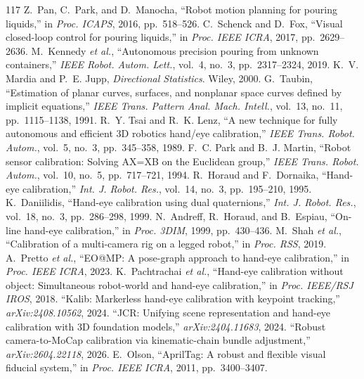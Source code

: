 \documentclass[10pt,journal]{IEEEtran}
\begin{document}
{\begin{thebibliography}{117}
 Z.~Pan, C.~Park, and D.~Manocha, ``Robot motion planning for pouring liquids,'' in \emph{Proc. ICAPS}, 2016, pp.~518--526.
 C.~Schenck and D.~Fox, ``Visual closed-loop control for pouring liquids,'' in \emph{Proc. IEEE ICRA}, 2017, pp.~2629--2636.
 M.~Kennedy \emph{et al.}, ``Autonomous precision pouring from unknown containers,'' \emph{IEEE Robot. Autom. Lett.}, vol.~4, no.~3, pp.~2317--2324, 2019.
 K.~V. Mardia and P.~E. Jupp, \emph{Directional Statistics}. Wiley, 2000.
 G.~Taubin, ``Estimation of planar curves, surfaces, and nonplanar space curves defined by implicit equations,'' \emph{IEEE Trans. Pattern Anal. Mach. Intell.}, vol.~13, no.~11, pp.~1115--1138, 1991.
 R.~Y. Tsai and R.~K. Lenz, ``A new technique for fully autonomous and efficient 3D robotics hand/eye calibration,'' \emph{IEEE Trans. Robot. Autom.}, vol.~5, no.~3, pp.~345--358, 1989.
 F.~C. Park and B.~J. Martin, ``Robot sensor calibration: Solving AX=XB on the Euclidean group,'' \emph{IEEE Trans. Robot. Autom.}, vol.~10, no.~5, pp.~717--721, 1994.
 R.~Horaud and F.~Dornaika, ``Hand-eye calibration,'' \emph{Int. J. Robot. Res.}, vol.~14, no.~3, pp.~195--210, 1995.
 K.~Daniilidis, ``Hand-eye calibration using dual quaternions,'' \emph{Int. J. Robot. Res.}, vol.~18, no.~3, pp.~286--298, 1999.
 N.~Andreff, R.~Horaud, and B.~Espiau, ``On-line hand-eye calibration,'' in \emph{Proc. 3DIM}, 1999, pp.~430--436.
 M.~Shah \emph{et al.}, ``Calibration of a multi-camera rig on a legged robot,'' in \emph{Proc. RSS}, 2019.
 A.~Pretto \emph{et al.}, ``EO@MP: A pose-graph approach to hand-eye calibration,'' in \emph{Proc. IEEE ICRA}, 2023.
 K.~Pachtrachai \emph{et al.}, ``Hand-eye calibration without object: Simultaneous robot-world and hand-eye calibration,'' in \emph{Proc. IEEE/RSJ IROS}, 2018.
 ``Kalib: Markerless hand-eye calibration with keypoint tracking,'' \emph{arXiv:2408.10562}, 2024.
 ``JCR: Unifying scene representation and hand-eye calibration with 3D foundation models,'' \emph{arXiv:2404.11683}, 2024.
 ``Robust camera-to-MoCap calibration via kinematic-chain bundle adjustment,'' \emph{arXiv:2604.22118}, 2026.
 E.~Olson, ``AprilTag: A robust and flexible visual fiducial system,'' in \emph{Proc. IEEE ICRA}, 2011, pp.~3400--3407.

\end{thebibliography}}
\end{document}
